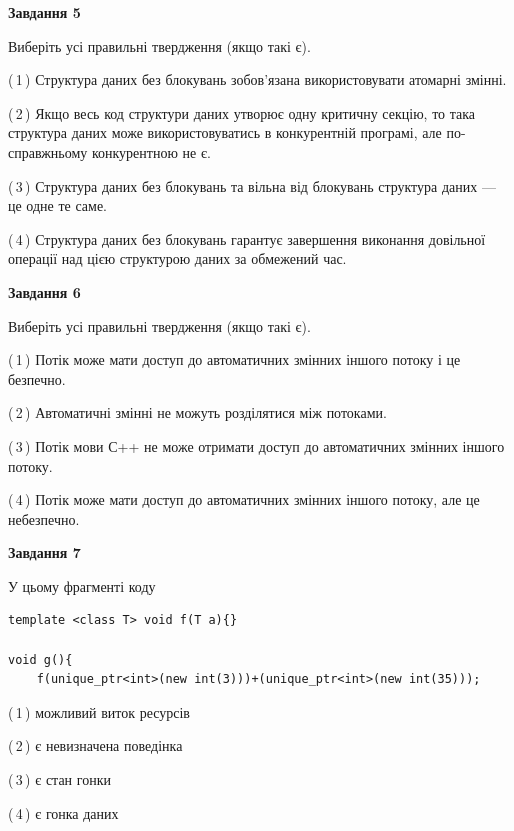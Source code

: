 \documentclass[12pt, ukrainian]{article}
\begin{document}
\begin {large}
{\begin{center}
\textbf{Завдання 5}
\end{center}

Виберіть усі правильні твердження (якщо такі є).\par
\vspace{2mm}

(\,1\,) Структура даних без блокувань зобов’язана використовувати атомарні змінні.%

(\,2\,) Якщо весь код структури даних утворює одну критичну секцію, то така структура даних може використовуватись в конкурентній програмі, але по-справжньо\-му конкурентною не є.%

(\,3\,) Структура даних без блокувань та вільна від блокувань структура даних --- це одне те саме.%

(\,4\,) Структура даних без блокувань гарантує завершення виконання довільної операції над цією структурою даних за обмежений час.%
\newpage


\begin{center}
\textbf{Завдання 6}
\end{center}

Виберіть усі правильні твердження (якщо такі є).\par
\vspace{2mm}

(\,1\,) Потік може мати доступ до автоматичних змінних іншого потоку і це безпечно.%

(\,2\,) Автоматичні змінні не можуть розділятися між потоками.%

(\,3\,) Потік мови С++ не може отримати доступ до автоматичних змінних іншого потоку.%

(\,4\,) Потік може мати доступ до автоматичних змінних іншого потоку, але це небезпечно.%


\begin{center}
\textbf{Завдання 7}
\end{center}

У цьому фрагменті коду
\begin{verbatim}
template <class T> void f(T a){}

void g(){
    f(unique_ptr<int>(new int(3)))+(unique_ptr<int>(new int(35)));
\end{verbatim}

(\,1\,) можливий виток ресурсів%

(\,2\,) є невизначена поведінка%

(\,3\,) є стан гонки%

(\,4\,) є гонка даних%

}
\end {large}

\vspace{4mm}
\newpage
\end{document}
